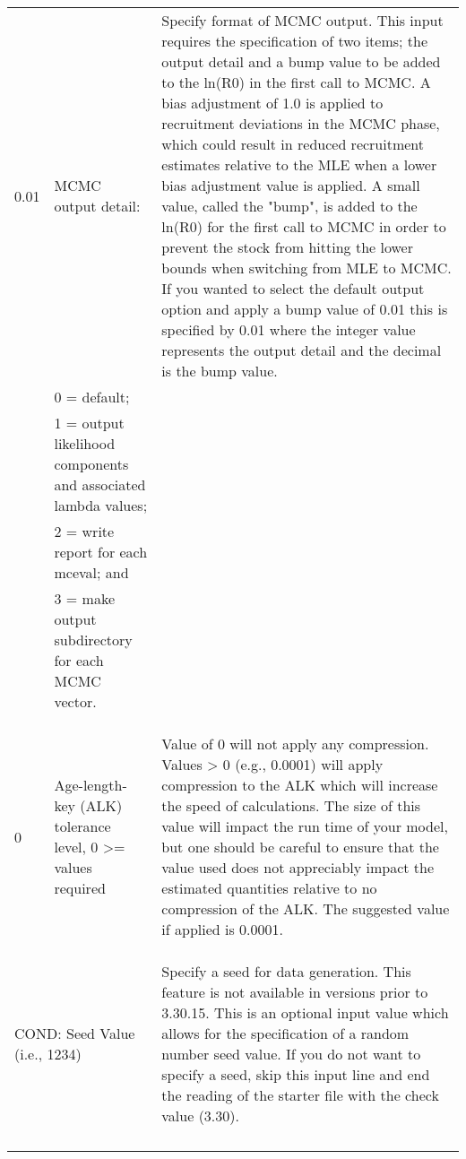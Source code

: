{\begin{landscape}
\begin{longtable}{p{1.5cm} p{7.2cm} p{12.3cm}}
  \hline
  0.01 & MCMC output detail: & \multirow{1}{1cm}[-0.25cm]{\parbox{12.5cm}{Specify format of MCMC output. This input requires the specification of two items; the output detail and a bump value to be added to the ln(R0) in the first call to MCMC. A bias adjustment of 1.0 is applied to recruitment deviations in the MCMC phase, which could result in reduced recruitment estimates relative to the MLE when a lower bias adjustment value is applied.  A small value, called the "bump", is added to the ln(R0) for the first call to MCMC in order to prevent the stock from hitting the lower bounds when switching from MLE to MCMC. If you wanted to select the default output option and apply a bump value of 0.01 this is specified by 0.01 where the integer value represents the output detail and the decimal is the bump value.}} \Tstrut\\
  & 0 = default; & \\
  & 1 = output likelihood components and associated lambda values; &  \\
  & 2 = write report for each mceval; and &  \\		 
  & 3 = make output subdirectory for each MCMC vector. &  \\
  & & \\
  & & \\ 
  & & \\  		 
  
  \hline
  \hypertarget{ALK}{0} & Age-length-key (ALK) tolerance level, 0 >= values required & \multirow{1}{1cm}[-0.25cm]{\parbox{12.5cm}{Value of 0 will not apply any compression.  Values > 0 (e.g., 0.0001) will apply compression to the ALK which will increase the speed of calculations.  The size of this value will impact the run time of your model, but one should be careful to ensure that the value used does not appreciably impact the estimated quantities relative to no compression of the ALK.  The suggested value if applied is 0.0001.}} \Tstrut\\ 
  & & \\
  & & \\
  & & \Bstrut\\
  
  \hline  
  \multicolumn{2}{l}{COND: Seed Value (i.e., 1234)}& \multirow{1}{1cm}[-0.25cm]{\parbox{12.5cm}{Specify a seed for data generation. This feature is not available in versions prior to 3.30.15. This is an optional input value which allows for the specification of a random number seed value.  If you do not want to specify a seed, skip this input line and end the reading of the starter file with the check value (3.30). }} \Tstrut\\
  & & \\ 
  & & \\
  & & \\ 
  & & \\
  

\end{longtable}
\end{landscape}}
